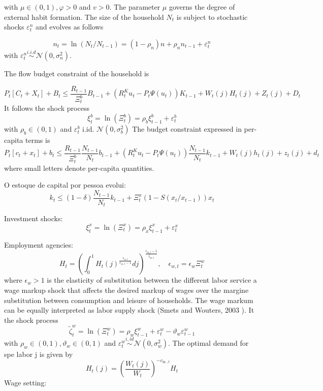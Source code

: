with $\mu \in(0,1), \varphi>0$ and $v>0$. The parameter $\mu$ governs the degree of external habit formation. The size of the household $N_{t}$ is subject to stochastic shocks $\varepsilon_{t}^{n}$ and evolves as
follows

$$
n_{t}=\ln \left(N_{t} / N_{t-1}\right)=\left(1-\rho_{n}\right) n+\rho_{n} n_{t-1}+\varepsilon_{t}^{n}
$$
with $\varepsilon_{t}^{n} \stackrel{i . i . d}{\sim} \mathcal{N}\left(0, \sigma_{n}^{2}\right)$.

The flow budget constraint of the household is

$$
P_{t}\left[C_{t}+X_{t}\right]+B_{t} \leq \frac{R_{t-1}}{\Xi_{t}^{b}} B_{t-1}+\left(R_{t}^{K} u_{t}-P_{t} \Psi\left(u_{t}\right)\right) K_{t-1}+W_{t}(j) H_{t}(j)+Z_{t}(j)+D_{t}
$$
It follows the shock process
$$
\xi_{t}^{b}=\ln \left(\Xi_{t}^{b}\right)=\rho_{b} \xi_{t-1}^{b}+\varepsilon_{t}^{b}
$$
with $\rho_{b} \in(0,1)$ and $\varepsilon_{t}^{b}$ i.id. $\mathcal{N}\left(0, \sigma_{b}^{2}\right)$
The budget constraint expressed in per-capita terms is
$$
P_{t}\left[c_{t}+x_{t}\right]+b_{t} \leq \frac{R_{t-1}}{\Xi_{t}^{b}} \frac{N_{t-1}}{N_{t}} b_{t-1}+\left(R_{t}^{K} u_{t}-P_{t} \Psi\left(u_{t}\right)\right) \frac{N_{t-1}}{N_{t}} k_{t-1}+W_{t}(j) h_{t}(j)+z_{t}(j)+d_{t}
$$
where small letters denote per-capita quantities.

O estoque de capital por pessoa evolui:
$$k_t \leq (1-\delta)\frac{N_{t-1}}{N_t}k_{t-1} + \Xi_t^{x}\left( 1 - S\left(x_t/x_{t-1} \right) \right)x_t $$

Investment shocks:
$$
\xi_{t}^{x}=\ln \left(\Xi_{t}^{x}\right)=\rho_{x} \xi_{t-1}^{x}+\varepsilon_{t}^{x}
$$

Employment agencies:
$$
H_{t}=\left(\int_{0}^{1} H_{t}(j)^{\frac{\epsilon_{w, t}}{e_{w, t}-1}} d j\right)^{\frac{\epsilon_{w, t}-1}{\zeta_{w, t}}}, \quad \epsilon_{w, t}=\epsilon_{w} \Xi_{t}^{w}
$$
where $\epsilon_{w}>1$ is the elasticity of substitution between the different labor service a wage markup shock that affects the desired markup of wages over the margine substitution between consumption and leisure of households. The wage markum can be equally interpreted as labor supply shock (Smets and Wouters, 2003 ). It the shock process
$$
\tilde{\zeta}_{t}^{w}=\ln \left(\Xi_{t}^{w}\right)=\rho_{w} \xi_{t-1}^{w}+\varepsilon_{t}^{w}-\vartheta_{w} \varepsilon_{t-1}^{w}
$$
with $\rho_{w} \in(0,1), \vartheta_{w} \in(0,1)$ and $\varepsilon_{t}^{w} \stackrel{i, i d}{\sim} \mathcal{N}\left(0, \sigma_{w}^{2}\right) .$ The optimal demand for spe
labor j is given by
$$
H_{t}(j)=\left(\frac{W_{t}(j)}{W_{t}}\right)^{-c_{\text {in }, t}} H_{t}
$$
Wage setting:

